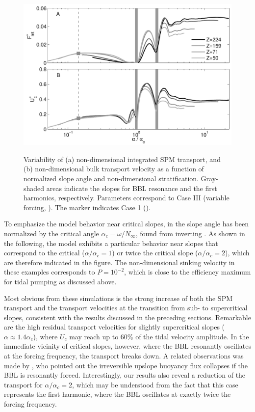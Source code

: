 \begin{figure}[h]
  \noindent\includegraphics[width=29pc,angle=0]{bilder/alphasoscal.pdf}\\
  \caption{Variability of (a) non-dimensional integrated SPM
    transport, and (b) non-dimensional bulk transport velocity as a
    function of normalized slope angle and non-dimensional
    stratification. Gray-shaded areas indicate the slopes for BBL
    resonance and the first harmonics, respectively. Parameters
    correspond to Case III (variable forcing, ). The
    marker indicates Case 1 (). \label{alphavar} }
\end{figure}
To emphasize the model behavior near critical slopes, in
 the slope angle has been normalized by the critical
angle $\alpha_c = \omega/N_\infty$, found from inverting
. As shown in the following, the model exhibits a
particular behavior near slopes that correspond to the critical
($\alpha/\alpha_c = 1$) or twice the critical slope ($\alpha/\alpha_c
= 2$), which are therefore indicated in the figure. The
non-dimensional sinking velocity in these examples corresponds to
$P=10^{-2}$, which is close to the efficiency maximum for tidal
pumping as discussed above.

Most obvious from these simulations is the strong increase of both the
SPM transport and the transport velocities at the transition from sub-
to supercritical slopes, consistent with the results discussed in the
preceding sections. Remarkable are the high residual transport
velocities for slightly supercritical slopes ($\alpha \approx 1.4
\alpha_c$), where $U_c$ may reach up to 60\% of the tidal velocity
amplitude. In the immediate vicinity of critical slopes, however,
where the BBL resonantly oscillates at the forcing frequency, the
transport breaks down. A related observations was made by
\cite{UmlaufBurchard2011a}, who pointed out the irreversible upslope
buoyancy flux collapses if the BBL is resonantly
forced. Interestingly, our results also reveal a reduction of the
transport for $\alpha/\alpha_c=2$, which may be understood from the
fact that this case represents the first harmonic, where the BBL
oscillates at exactly twice the forcing frequency.

